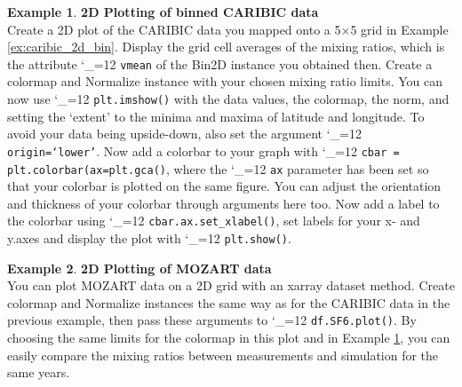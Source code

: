 \documentclass{article}
\makeatletter
\newcommand{\pyf}{%
  \begingroup\catcode`_=12
  \pyf@
}
\newcommand{\pyf@}[1]{\texttt{#1}\endgroup}
\theoremstyle{definition}
\newtheorem{exmp}{Example}[section]
\makeatother
\begin{document}
\begin{exmp}\label{ex:caribic_2d_plot}\textbf{2D Plotting of binned CARIBIC data} \\
Create a 2D plot of the CARIBIC data you mapped onto a 5$\times$5 grid in Example \ref{ex:caribic_2d_bin}. Display the grid cell averages of the mixing ratios, which is the attribute \pyf{vmean} of the Bin2D instance you obtained then. Create a colormap and Normalize instance with your chosen mixing ratio limits. You can now use \pyf{plt.imshow()} with the data values, the colormap, the norm, and setting the `extent' to the minima and maxima of latitude and longitude. To avoid your data being upside-down, also set the argument \pyf{origin=`lower'}. Now add a colorbar to your graph with \pyf{cbar = plt.colorbar(ax=plt.gca()}, where the \pyf{ax} parameter has been set so that your colorbar is plotted on the same figure. You can adjust the orientation and thickness of your colorbar through arguments here too. Now add a label to the colorbar using \pyf{cbar.ax.set_xlabel()}, set labels for your x- and y.axes and display the plot with \pyf{plt.show()}. \end{exmp}

\begin{exmp}\textbf{2D Plotting of MOZART data} \\
You can plot MOZART data on a 2D grid with an xarray dataset method. Create colormap and Normalize instances the same way as for the CARIBIC data in the previous example, then pass these arguments to \pyf{df.SF6.plot()}. By choosing the same limits for the colormap in this plot and in Example \ref{ex:caribic_2d_plot}, you can easily compare the mixing ratios between measurements and simulation for the same years. \end{exmp} 
\end{document}
